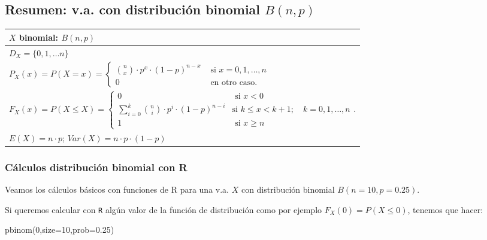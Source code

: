 \documentclass[
  letterpaper,
  DIV=11,
  numbers=noendperiod]{scrreprt}
\newenvironment{Shaded}{\begin{snugshade}}{\end{snugshade}}
\newcommand{\AttributeTok}[1]{\textcolor[rgb]{0.40,0.45,0.13}{#1}}
\newcommand{\DecValTok}[1]{\textcolor[rgb]{0.68,0.00,0.00}{#1}}
\newcommand{\FloatTok}[1]{\textcolor[rgb]{0.68,0.00,0.00}{#1}}
\newcommand{\FunctionTok}[1]{\textcolor[rgb]{0.28,0.35,0.67}{#1}}
\newcommand{\NormalTok}[1]{\textcolor[rgb]{0.00,0.23,0.31}{#1}}
\begin{document}
\subsection{\texorpdfstring{Resumen: v.a. con distribución binomial
\(B(n,p)\)}{Resumen: v.a. con distribución binomial B(n,p)}}\label{resumen-v.a.-con-distribuciuxf3n-binomial-bnp}

\begin{table}
\centering
\begin{tabular}{|l|}
\hline\rowcolor{LightBlue}
$X$ binomial: $B(n,p)$ \\\hline
$D_X= \{0,1,\ldots n\}$ \\\hline
$P_X(x)=P(X=x)=\left\{\begin{array}{ll}\scriptstyle {n\choose x}\cdot p^x\cdot (1-p)^{n-x} & \mbox{ si } x=0,1,\ldots,n\\0 & \mbox{ en otro caso.}\end{array}\right.$ \\\hline
$F_X(x)=P(X\leq X)=
\scriptstyle\left\{
\begin{array}{ll}
 0 & \mbox{ si } x<0\\ 
\sum_{i=0}^k {n\choose i}\cdot p^i\cdot (1-p)^{n-i} & \mbox{si } k\leq x< k+1;\quad k=0,1,\dots,n \\ 
1 & \mbox{ si } x\geq n
\end{array}
\right.$.\\\hline
$E(X)=n\cdot p$; $ Var(X)=n\cdot p \cdot (1-p)$ \\\hline
\end{tabular}
\end{table}

\subsubsection{Cálculos distribución binomial con
R}\label{cuxe1lculos-distribuciuxf3n-binomial-con-r}

Veamos los cálculos básicos con funciones de R para una v.a. \(X\) con
distribución binomial \(B(n=10,p=0.25)\).

Si queremos calcular con \texttt{R} algún valor de la función de
distribución como por ejemplo \(F_X(0)=P(X\leq 0)\), tenemos que hacer:

\begin{Shaded}
\begin{Highlighting}[]
\FunctionTok{pbinom}\NormalTok{(}\DecValTok{0}\NormalTok{,}\AttributeTok{size=}\DecValTok{10}\NormalTok{,}\AttributeTok{prob=}\FloatTok{0.25}\NormalTok{)}
\end{Highlighting}
\end{Shaded}
\end{document}

